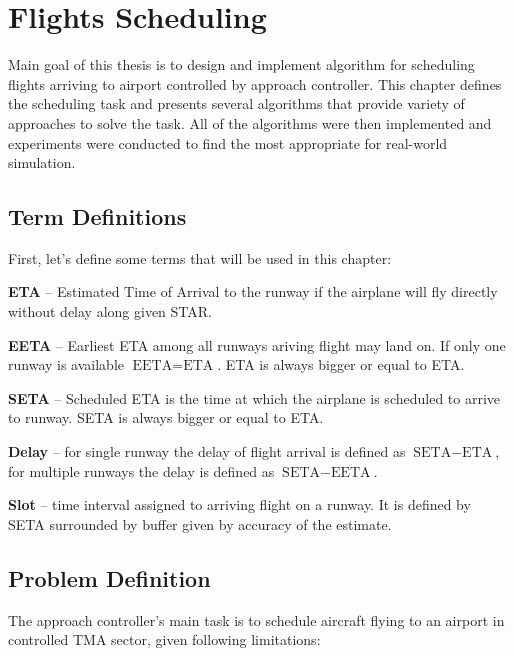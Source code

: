 
\chapter{Flights Scheduling}

\label{section:scheduling}

Main goal of this thesis is to design and implement algorithm for scheduling flights arriving to airport controlled by approach controller. This chapter defines the scheduling task and presents several algorithms that provide variety of approaches to solve the task. All of the algorithms were then implemented and experiments were conducted to find the most appropriate for real-world simulation.

\section{Term Definitions}

First, let's define some terms that will be used in this chapter:

\bitem
\item \textbf{ETA} – Estimated Time of Arrival to the runway if the airplane will fly directly without delay along given STAR.
\item \textbf{EETA} – Earliest ETA among all runways ariving flight may land on. If only one runway is available $\text{EETA}=\text{ETA}$. ETA is always bigger or equal to ETA.
\item \textbf{SETA} – Scheduled ETA is the time at which the airplane is scheduled to arrive to runway. SETA is always bigger or equal to ETA.
\item \textbf{Delay} – for single runway the delay of flight arrival is defined as $\text{SETA}-\text{ETA}$, for multiple runways the delay is defined as $\text{SETA}-\text{EETA}$.
\item \textbf{Slot} – time interval assigned to arriving flight on a runway. It is defined by SETA surrounded by buffer given by accuracy of the estimate.
\eitem

\section{Problem Definition}

The approach controller's main task is to schedule aircraft flying to an airport in controlled TMA sector, given following limitations:

